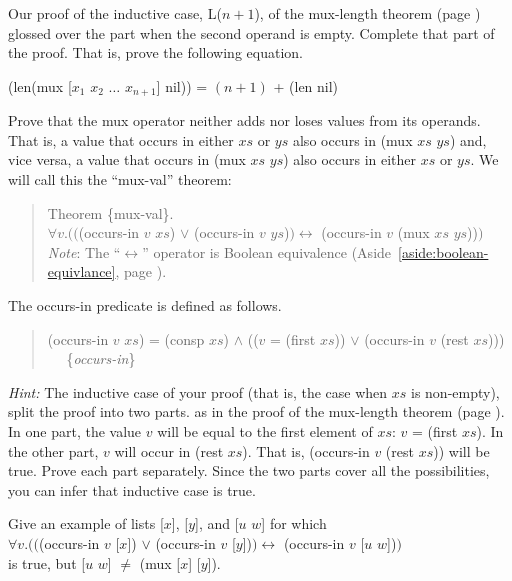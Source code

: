 \begin{ExerciseList}
\Exercise
Our proof of the inductive case, L($n+1$), of the mux-length theorem
(page \pageref{mux-length-thm-induc-case})
glossed over the part when the second operand is empty.
Complete that part of the proof. That is, prove the following equation.

\hspace{1cm} (len(mux [$x_1$ $x_2$ $\dots$ $x_{n+1}$] nil)) = $(n+1)$ + (len nil)

\Exercise [label={ex:mul-val-thm}]
Prove that the mux operator neither adds nor loses values from its operands.
That is, a value that occurs in either $xs$ or $ys$ also occurs in (mux $xs$ $ys$)
and, vice versa, a value that occurs in (mux $xs$ $ys$) also occurs in either $xs$ or $ys$.
We will call this the ``mux-val'' theorem:

\begin{quote}
\label{thm:mux-val}
Theorem \{mux-val\}.\\
$\forall v.(($(occurs-in $v$ $xs$) $\vee$ (occurs-in $v$ $ys$)$) \leftrightarrow$ (occurs-in $v$ (mux $xs$ $ys$))$)$ \\
\emph{Note}: The ``$\leftrightarrow$'' operator
is Boolean equivalence (Aside~\ref{aside:boolean-equivlance}, page \pageref{aside:boolean-equivlance}).
\end{quote}

The occurs-in predicate is defined as follows.
\begin{quote}
\label{def:occurs-in}
(occurs-in $v$ $xs$) = (consp $xs$) $\wedge$ (($v$ = (first $xs$)) $\vee$ (occurs-in $v$ (rest $xs$))) ~~ \{\emph{occurs-in}\}
\end{quote}

\emph{Hint:} The inductive case of your proof
(that is, the case when $xs$ is non-empty),
split the proof into two parts.
as in the proof of the mux-length theorem (page \pageref{mux-length-thm}).
In one part, the value $v$ will be equal to
the first element of $xs$:
$v$ = (first $xs$).
In the other part, $v$ will occur in (rest $xs$).
That is, (occurs-in $v$ (rest $xs$)) will be true.
Prove each part separately.
Since the two parts cover all the possibilities,
you can infer that inductive case is true.

\Exercise\label{mux-val-len-not-enough}
Give an example of lists [$x$], [$y$], and [$u$ $w$] for which \\
\hspace*{1cm}$\forall v.(($(occurs-in $v$ [$x$]) $\vee$ (occurs-in $v$ [$y$])$)
\leftrightarrow$ (occurs-in $v$ [$u$ $w$])$)$\\
is true, but [$u$ $w$] $\neq$ (mux [$x$] [$y$]).


\end{ExerciseList}
